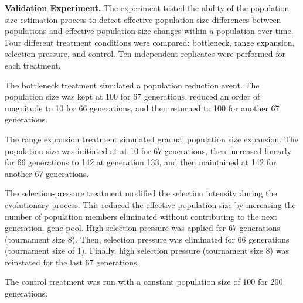 \textbf{Validation Experiment.}
The experiment tested the ability of the population size estimation process to detect effective population size differences between populations and effective population size changes within a population over time.
Four different treatment conditions were compared: bottleneck, range expansion, selection pressure, and control.
Ten independent replicates were performed for each treatment.

The bottleneck treatment simulated a population reduction event.
The population size was kept at 100 for 67 generations, reduced an order of magnitude to 10 for 66 generations, and then returned to 100 for another 67 generations.

The range expansion treatment simulated gradual population size expansion.
The population size was initiated at at 10 for 67 generations, then increased linearly for 66 generations to 142 at generation 133, and then maintained at 142 for another 67 generations.

The selection-pressure treatment modified the selection intensity during the evolutionary process.
This reduced the effective population size by increasing the number of population members eliminated without contributing to the next generation. gene pool.
High selection pressure was applied for 67 generations (tournament size 8). Then, selection pressure was eliminated for 66 generations (tournament size of 1).
Finally, high selection pressure (tournament size 8) was reinstated for the last 67 generations.

The control treatment was run with a constant population size of 100 for 200 generations.
